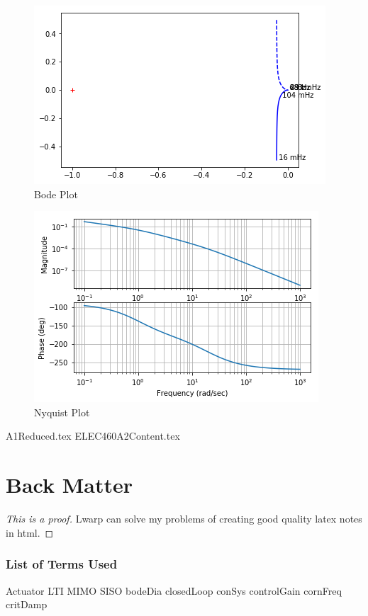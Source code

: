 \documentclass{scrreprt}
\theoremstyle{plain}
\theoremstyle{definition}
\theoremstyle{remark}
\begin{document}
\begin{figure}
	\includegraphics[width=0.7\linewidth]{Assignments/A1/ipython_files/qt_img494204706881540}
	\caption{Bode Plot}
\end{figure}

\begin{figure}
	\includegraphics[width=0.7\linewidth]{Assignments/A1/ipython_files/qt_img492813137477636}
	\caption{Nyquist Plot}
\end{figure}

{A1Reduced.tex}
{ELEC460A2Content.tex}
\part{Back Matter}

\begin{proof}[This is a proof]
	Lwarp can solve my problems of creating good quality latex notes in html.
\end{proof}
\section*{List of Terms Used}
\gls{Actuator} \gls{LTI} \gls{MIMO} \gls{SISO} \gls{bodeDia} \gls{closedLoop} \gls{conSys} \gls{controlGain} \gls{cornFreq} \gls{critDamp} 
\end{document}
